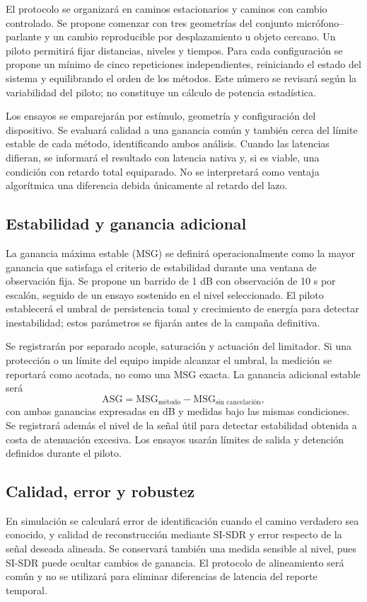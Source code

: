 El protocolo se organizará en caminos estacionarios y caminos con cambio controlado. Se propone comenzar con tres geometrías del conjunto micrófono--parlante y un cambio reproducible por desplazamiento u objeto cercano. Un piloto permitirá fijar distancias, niveles y tiempos. Para cada configuración se propone un mínimo de cinco repeticiones independientes, reiniciando el estado del sistema y equilibrando el orden de los métodos. Este número se revisará según la variabilidad del piloto; no constituye un cálculo de potencia estadística.

Los ensayos se emparejarán por estímulo, geometría y configuración del dispositivo. Se evaluará calidad a una ganancia común y también cerca del límite estable de cada método, identificando ambos análisis. Cuando las latencias difieran, se informará el resultado con latencia nativa y, si es viable, una condición con retardo total equiparado. No se interpretará como ventaja algorítmica una diferencia debida únicamente al retardo del lazo.

\subsection{Estabilidad y ganancia adicional}
La ganancia máxima estable (MSG) se definirá operacionalmente como la mayor ganancia que satisfaga el criterio de estabilidad durante una ventana de observación fija. Se propone un barrido de 1 dB con observación de 10 s por escalón, seguido de un ensayo sostenido en el nivel seleccionado. El piloto establecerá el umbral de persistencia tonal y crecimiento de energía para detectar inestabilidad; estos parámetros se fijarán antes de la campaña definitiva.

Se registrarán por separado acople, saturación y actuación del limitador. Si una protección o un límite del equipo impide alcanzar el umbral, la medición se reportará como acotada, no como una MSG exacta. La ganancia adicional estable será
\begin{equation}
\mathrm{ASG}=\mathrm{MSG}_{\text{método}}-\mathrm{MSG}_{\text{sin cancelación}},
\end{equation}
con ambas ganancias expresadas en dB y medidas bajo las mismas condiciones. Se registrará además el nivel de la señal útil para detectar estabilidad obtenida a costa de atenuación excesiva. Los ensayos usarán límites de salida y detención definidos durante el piloto.

\subsection{Calidad, error y robustez}
En simulación se calculará error de identificación cuando el camino verdadero sea conocido, y calidad de reconstrucción mediante SI-SDR\cite{leroux2019} y error respecto de la señal deseada alineada. Se conservará también una medida sensible al nivel, pues SI-SDR puede ocultar cambios de ganancia. El protocolo de alineamiento será común y no se utilizará para eliminar diferencias de latencia del reporte temporal.

